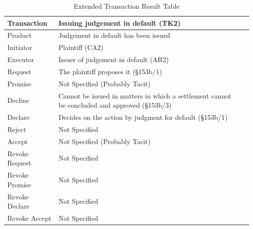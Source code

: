 \begin{landscape}
\begin{table}[h]
\caption{Extended Transaction Result Table}
\label{tab:etrt}
\begin{tabular}{|l||l|l|}
\hline
Transaction  & Issuing judgement in default (TK2) \\ \hline
Product  & Judgement in default has been issued \\ \hline
Initiator      &  Plaintiff (CA2)\\ \hline
Executor       &  Issuer of judgement in default (AR2)      \\ \hline
Request        & The plaintiff proposes it (\S153b/1)   \\ \hline
Promise        &  Not Specified (Probably Tacit)   \\ \hline
Decline        &  Cannot be issued in matters in which a settlement cannot be concluded and approved (\S153b/3) \\ \hline
Declare        & Decides on the action by judgment for default (\S153b/1) \\ \hline
Reject         &  Not Specified   \\ \hline
Accept         &  Not Specified (Probably Tacit) \\ \hline
Revoke Request &  Not Specified        \\ \hline
Revoke Promise &  Not Specified       \\ \hline
Revoke Declare &  Not Specified      \\ \hline
Revoke Accept  &  Not Specified             \\ \hline
\end{tabular}
\end{table}


\end{landscape}
